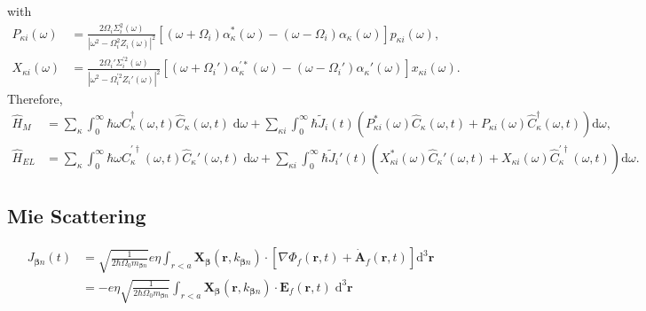 \documentclass{article}
\begin{document}
with
\begin{equation}
\begin{split}
P_{\kappa i}(\omega) &= \frac{2\Omega_i\Sigma_i^2(\omega)}{|\omega^2 - \Omega_i^2Z_i(\omega)|^2}[(\omega + \Omega_i)\alpha_\kappa^*(\omega) - (\omega - \Omega_i)\alpha_\kappa(\omega)]p_{\kappa i}(\omega),\\
X_{\kappa i}(\omega) &= \frac{2\Omega_i'\Sigma_i^{\prime2}(\omega)}{|\omega^2 - \Omega_i^{\prime2}Z_i'(\omega)|^2}[(\omega + \Omega_i')\alpha_\kappa^{\prime*}(\omega) - (\omega - \Omega_i')\alpha_\kappa'(\omega)]x_{\kappa i}(\omega).
\end{split}
\end{equation}
Therefore,
\begin{equation}
\begin{split}
\hat{H}_M &= \sum_\kappa\int_0^\infty\hbar\omega\hat{C}_\kappa^\dagger(\omega,t)\hat{C}_\kappa(\omega,t)\;\mathrm{d}\omega + \sum_{\kappa i}\int_0^\infty\hbar\tilde{J}_i(t)\left(P_{\kappa i}^*(\omega)\hat{C}_\kappa(\omega,t) + P_{\kappa i}(\omega)\hat{C}_\kappa^\dagger(\omega,t)\right)\mathrm{d}\omega,\\
\hat{H}_{EL} &= \sum_\kappa\int_0^\infty\hbar\omega\hat{C}_\kappa^{\prime\dagger}(\omega,t)\hat{C}_\kappa'(\omega,t)\;\mathrm{d}\omega + \sum_{\kappa i}\int_0^\infty\hbar\tilde{J}_i'(t)\left(X_{\kappa i}^*(\omega)\hat{C}_\kappa'(\omega,t) + X_{\kappa i}(\omega)\hat{C}_\kappa^{\prime\dagger}(\omega,t)\right)\mathrm{d}\omega.
\end{split}
\end{equation}














\subsection{Mie Scattering}

\begin{equation}
\begin{split}
J_{\bm{\beta}n}(t) &= \sqrt{\frac{1}{2\hbar\Omega_0m_{\bm{\beta}n}}}e\eta\int_{r<a}\mathbf{X}_{\bm{\beta}}(\mathbf{r},k_{\bm{\beta}n})\cdot\left[\nabla\Phi_f(\mathbf{r},t) + \dot{\mathbf{A}}_f(\mathbf{r},t)\right]\mathrm{d}^3\mathbf{r}\\
&= -e\eta\sqrt{\frac{1}{2\hbar\Omega_0m_{\bm{\beta}n}}}\int_{r<a}\mathbf{X}_{\bm{\beta}}(\mathbf{r},k_{\bm{\beta}n})\cdot\mathbf{E}_f(\mathbf{r},t)\;\mathrm{d}^3\mathbf{r}
\end{split}
\end{equation}
\end{document}
